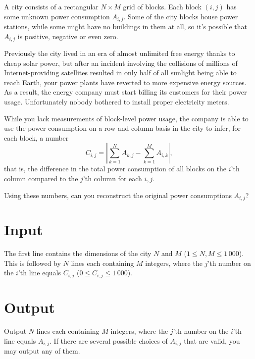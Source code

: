 A city consists of a rectangular $N \times M$ grid of blocks.
Each block $(i, j)$ has some unknown power consumption $A_{i, j}$.
Some of the city blocks house power stations, while some might have no buildings in them at all, so it's possible that $A_{i, j}$ is positive, negative or even zero.

Previously the city lived in an era of almost unlimited free energy thanks to cheap solar power, but after an incident involving the collisions of millions of Internet-providing satellites resulted in only half of all sunlight being able to reach Earth, your power plants have reverted to more expensive energy sources.
As a result, the energy company must start billing its customers for their power usage.
Unfortunately nobody bothered to install proper electricity meters.

While you lack measurements of block-level power usage, the company is able to use the power consumption on a row and column basis in the city to infer, for each block, a number
$$C_{i, j} = \left| \sum_{k=1}^N A_{k, j} - \sum_{k=1}^M A_{i, k} \right| \text{,}$$
that is, the difference in the total power consumption of all blocks on the $i$'th column compared to the $j$'th column for each $i, j$.

Using these numbers, can you reconstruct the original power consumptions $A_{i, j}$?

\section*{Input}
The first line contains the dimensions of the city $N$ and $M$ ($1 \le N, M \le 1\,000$).
This is followed by $N$ lines each containing $M$ integers, where the $j$'th number on the $i$'th line equals $C_{i, j}$ ($0 \le C_{i, j} \le 1\,000$).

\section*{Output}
Output $N$ lines each containing $M$ integers, where the $j$'th number on the $i$'th line equals $A_{i, j}$.
If there are several possible choices of $A_{i, j}$ that are valid, you may output any of them.

